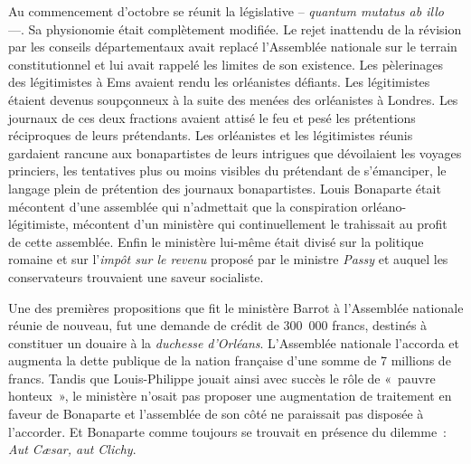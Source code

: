 \documentclass[french,twoside]{book} %
\begin{document}
Au commencement d’octobre se réunit la législative – \emph{quantum mutatus ab illo} —. Sa physionomie était complètement modifiée. Le rejet inattendu de la révision par les conseils départementaux avait replacé l’Assemblée nationale sur le terrain constitutionnel et lui avait rappelé les limites de son existence. Les pèlerinages des légitimistes à Ems avaient rendu les orléanistes défiants. Les légitimistes étaient devenus soupçonneux à la suite des menées des orléanistes à Londres. Les journaux de ces deux fractions avaient attisé le feu et pesé les prétentions réciproques de leurs prétendants. Les orléanistes et les légitimistes réunis gardaient rancune aux bonapartistes de leurs intrigues que dévoilaient les voyages princiers, les tentatives plus ou moins visibles du prétendant de s’émanciper, le langage plein de prétention des journaux bonapartistes. Louis Bonaparte était mécontent d’une assemblée qui n’admettait que la conspiration orléano-légitimiste, mécontent d’un ministère qui continuellement le trahissait au profit de cette assemblée. Enfin le ministère lui-même était divisé sur la politique romaine et sur l’\emph{impôt sur le revenu} proposé par le ministre \emph{Passy} et auquel les conservateurs trouvaient une saveur socialiste.\par
Une des premières propositions que fit le ministère Barrot à l’Assemblée nationale réunie de nouveau, fut une demande de crédit de 300 000 francs, destinés à constituer un douaire à la \emph{duchesse d’Orléans}. L’Assemblée nationale l’accorda et augmenta la dette publique de la nation française d’une somme de 7 millions de francs. Tandis que Louis-Philippe jouait ainsi avec succès le rôle de « pauvre honteux », le ministère n’osait pas proposer une augmentation de traitement en faveur de Bonaparte et l’assemblée de son côté ne paraissait pas disposée à l’accorder. Et Bonaparte comme toujours se trouvait en présence du dilemme : \emph{Aut Cæsar, aut Clichy}.\par
\end{document}
